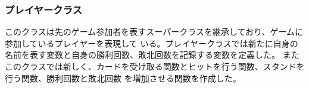 \subsubsection{プレイヤークラス}
このクラスは先のゲーム参加者を表すスーパークラスを継承しており、ゲームに参加しているプレイヤーを表現して
いる。プレイヤークラスでは新たに自身の名前を表す変数と自身の勝利回数、敗北回数を記録する変数を定義した。
またこのクラスでは新しく、カードを受け取る関数とヒットを行う関数、スタンドを行う関数、勝利回数と敗北回数
を増加させる関数を作成した。%

